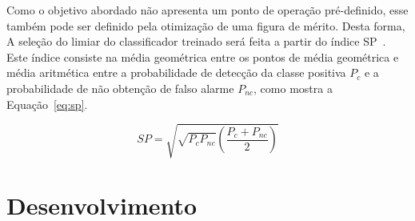 Como o objetivo abordado não apresenta um ponto de operação pré-definido, esse
também pode ser definido pela otimização de uma figura de mérito.
Desta forma, A seleção do limiar do classificador treinado será feita a partir do
índice SP~\cite{ciodaro12}.
Este índice consiste na média geométrica entre os pontos de média geométrica e
média aritmética entre a probabilidade de detecção da classe positiva $P_c$ e a
probabilidade de não obtenção de falso alarme $P_{nc}$, como mostra a
Equação~\ref{eq:sp}.

\begin{equation} \label{eq:sp}
    SP = \sqrt{\sqrt{P_c P_{nc}} \left(\frac{P_c + P_{nc}}{2}\right)}
\end{equation}

\section{Desenvolvimento}
